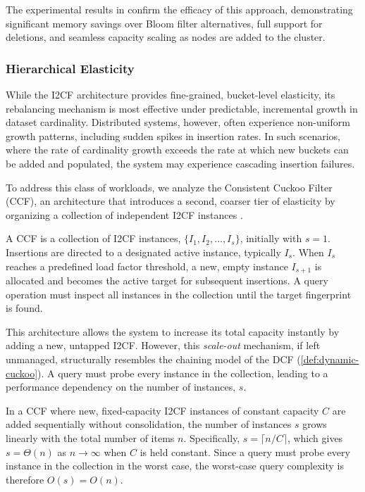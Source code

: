 The experimental results in \cite{Luo2018DistributedDC} confirm the efficacy of this approach, demonstrating significant memory savings over Bloom filter alternatives, full support for deletions, and seamless capacity scaling as nodes are added to the cluster.

\subsubsection{Hierarchical Elasticity}

While the I2CF architecture provides fine-grained, bucket-level elasticity, its rebalancing mechanism is most effective under predictable, incremental growth in dataset cardinality. Distributed systems, however, often experience non-uniform growth patterns, including sudden spikes in insertion rates. In such scenarios, where the rate of cardinality growth exceeds the rate at which new buckets can be added and populated, the system may experience cascading insertion failures.

To address this class of workloads, we analyze the Consistent Cuckoo Filter (CCF), an architecture that introduces a second, coarser tier of elasticity by organizing a collection of independent I2CF instances \cite{Luo2021ACC}.

\begin{definition}
    A CCF is a collection of I2CF instances, $\{I_1, I_2, \ldots, I_s\}$, initially with $s=1$. Insertions are directed to a designated active instance, typically $I_s$. When $I_s$ reaches a predefined load factor threshold, a new, empty instance $I_{s+1}$ is allocated and becomes the active target for subsequent insertions. A query operation must inspect all instances in the collection until the target fingerprint is found.
\end{definition}

This architecture allows the system to increase its total capacity instantly by adding a new, untapped I2CF. However, this \emph{scale-out} mechanism, if left unmanaged, structurally resembles the chaining model of the DCF (\ref{def:dynamic-cuckoo}). A query must probe every instance in the collection, leading to a performance dependency on the number of instances, $s$.

\begin{proposition}
    In a CCF where new, fixed-capacity I2CF instances of constant capacity $C$ are added sequentially without consolidation, the number of instances $s$ grows linearly with the total number of items $n$. Specifically, $s = \lceil n/C \rceil$, which gives $s = \Theta(n)$ as $n \to \infty$ when $C$ is held constant. Since a query must probe every instance in the collection in the worst case, the worst-case query complexity is therefore $O(s) = O(n)$.
\end{proposition}

